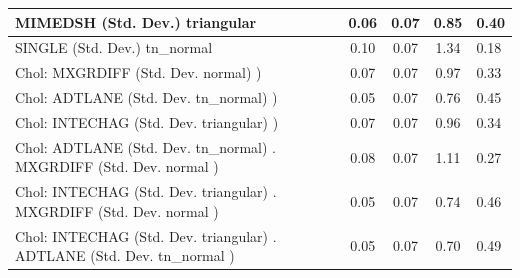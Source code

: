 \begin{table}
\begin{center}
\begin{tabular}{|l|l|c|c|c|l|}
			\hline
			MIMEDSH (Std. Dev.) triangular &  & 0.06 & 0.07 & 0.85 & 0.40 \\
			\hline
			SINGLE (Std. Dev.) tn_normal &  & 0.10 & 0.07 & 1.34 & 0.18 \\
			\hline
			 Chol: MXGRDIFF (Std. Dev. normal) ) &  & 0.07 & 0.07 & 0.97 & 0.33 \\
			\hline
			 Chol: ADTLANE (Std. Dev. tn_normal) ) &  & 0.05 & 0.07 & 0.76 & 0.45 \\
			\hline
			 Chol: INTECHAG (Std. Dev. triangular) ) &  & 0.07 & 0.07 & 0.96 & 0.34 \\
			\hline
			 Chol: ADTLANE (Std. Dev. tn_normal) . MXGRDIFF (Std. Dev.   normal ) &  & 0.08 & 0.07 & 1.11 & 0.27 \\
			\hline
			 Chol: INTECHAG (Std. Dev. triangular) . MXGRDIFF (Std. Dev.   normal ) &  & 0.05 & 0.07 & 0.74 & 0.46 \\
			\hline
			 Chol: INTECHAG (Std. Dev. triangular) . ADTLANE (Std. Dev.   tn_normal ) &  & 0.05 & 0.07 & 0.70 & 0.49 \\
			\hline
		\end{tabular}
	\end{center}
\end{table}